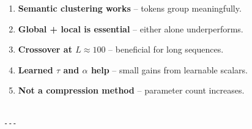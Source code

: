 \begin{enumerate}
\item \textbf{Semantic clustering works} -- tokens group meaningfully.
\item \textbf{Global + local is essential} -- either alone underperforms.
\item \textbf{Crossover at $L \approx 100$} -- beneficial for long sequences.
\item \textbf{Learned $\tau$ and $\alpha$ help} -- small gains from learnable scalars.
\item \textbf{Not a compression method} -- parameter count increases.
\end{enumerate}
\begin{lstlisting}

---
\end{lstlisting}